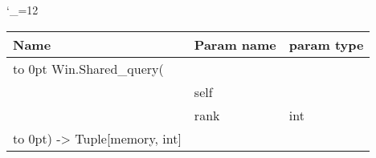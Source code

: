 \begingroup \catcode`\_=12 \tt
\begin{tabular}{lll}
\toprule
\textrm{Name}&\textrm{Param name}&\textrm{param type}\\
\midrule
\hbox to 0pt {Win.Shared_query(\hss}\\
& self\\
& rank & int\\
\hbox to 0pt{) -> Tuple[memory, int]\hss}\\
\bottomrule
\end{tabular}
\endgroup
